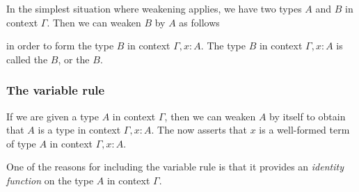 In the simplest situation where weakening applies, we have two types $A$ and $B$ in context $\Gamma$. Then we can weaken $B$ by $A$ as follows
\begin{prooftree}
\end{prooftree}
in order to form the type $B$ in context $\Gamma,x:A$. The type $B$ in context $\Gamma,x:A$ is called the  $B$, or the  $B$.

\subsubsection*{The variable rule}
If we are given a type $A$ in context $\Gamma$, then we can weaken $A$ by itself to obtain that $A$ is a type in context $\Gamma,x:A$. The  now asserts that $x$ is a well-formed term of type $A$ in context $\Gamma,x:A$.
\begin{prooftree}
\end{prooftree}
One of the reasons for including the variable rule is that it provides an \emph{identity function} on the type $A$ in context $\Gamma$.

